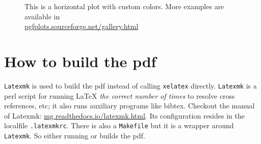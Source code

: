 \begin{figure}
  \centering
  \caption[Horizontal plot with custom colors]{
    This is a horizontal plot with custom colors.
    More examples are available in\\
    \href{http://pgfplots.sourceforge.net/gallery.html}
         {pgfplots.sourceforge.net/gallery.html}
  }
  \label{fig:plot-2}
\end{figure}

\section{How to build the pdf}

\texttt{Latexmk} is used to build the pdf instead of
calling \texttt{xelatex} directly.
%
\texttt{Latexmk} is a perl script for running LaTeX
\emph{the correct number of times} to resolve cross references, etc;
it also runs auxiliary programs like bibtex.
%
Checkout the manual of Latexmk:
\href{http://mg.readthedocs.io/latexmk.html}{mg.readthedocs.io/latexmk.html}.
%
Its configuration resides in the localfile \texttt{.latexmkrc}.
%
There is also a \texttt{Makefile} but it is a wrapper around \texttt{Latexmk}.
%
So either running 
or 
builds the pdf.

